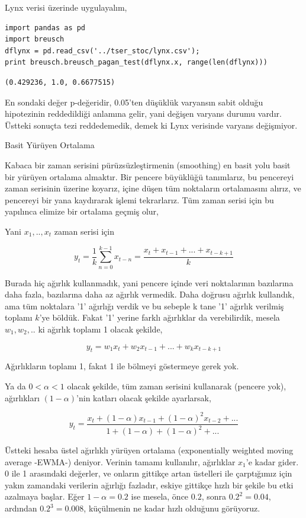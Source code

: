 \documentclass[12pt,fleqn]{article}\usepackage{../../common}
\begin{document}
\inputminted[fontsize=\footnotesize]{python}{breusch.py}

Lynx verisi üzerinde uygulayalım,

\begin{verbatim}
import pandas as pd
import breusch
dflynx = pd.read_csv('../tser_stoc/lynx.csv');
print breusch.breusch_pagan_test(dflynx.x, range(len(dflynx)))
\end{verbatim}

\begin{verbatim}
(0.429236, 1.0, 0.6677515)
\end{verbatim}

En sondaki değer p-değeridir, 0.05'ten düşüklük varyansın sabit olduğu
hipotezinin reddedildiği anlamına gelir, yani değişen varyans durumu
vardır. Üstteki sonuçta tezi reddedemedik, demek ki Lynx verisinde varyans
değişmiyor.

Basit Yürüyen Ortalama

Kabaca bir zaman serisini pürüzsüzleştirmenin (smoothing) en basit yolu
basit bir yürüyen ortalama almaktır. Bir pencere büyüklüğü tanımlarız, bu
pencereyi zaman serisinin üzerine koyarız, içine düşen tüm noktaların
ortalamasını alırız, ve pencereyi bir yana kaydırarak işlemi tekrarlarız. 
Tüm zaman serisi için bu yapılınca elimize bir ortalama geçmiş olur,

Yani $x_1,..,x_t$ zaman serisi için 

$$ 
y_t = \frac{1}{k} \sum _{n=0}^{k-1} x_{t-n}  
= \frac{x_t + x_{t-1} + ... + x_{t-k+1}}{k} 
$$

Burada hiç ağırlık kullanmadık, yani pencere içinde veri noktalarının
bazılarına daha fazla, bazılarına daha az ağırlık vermedik. Daha doğrusu
ağırlık kullandık, ama tüm noktalara '1' ağırlığı verdik ve bu sebeple k
tane '1' ağırlık verilmiş toplamı $k$'ye böldük. Fakat '1' yerine farklı
ağırlıklar da verebilirdik, mesela $w_1,w_2,..$ ki ağırlık toplamı 1 olacak
şekilde, 

$$ y_t = w_1x_t + w_2x_{t-1} + ... + w_kx_{t-k+1}
$$

Ağırlıkların toplamı 1, fakat 1 ile bölmeyi göstermeye gerek yok. 

Ya da $0 < \alpha < 1$ olacak şekilde, tüm zaman serisini kullanarak
(pencere yok), ağırlıkları $(1-\alpha)$'nin katları olacak şekilde
ayarlarsak,

$$ y_t = \frac{x_t + (1-\alpha)x_{t-1} + (1-\alpha)^2x_{t-2} + ... }
{1 + (1-\alpha) + (1-\alpha)^2 + ...} 
$$

Üstteki hesaba üstel ağırlıklı yürüyen ortalama (exponentially weighted
moving average -EWMA-) deniyor. Verinin tamamı kullanılır, ağırlıklar
$x_1$'e kadar gider. 0 ile 1 arasındaki değerler, ve onların gittikçe artan
üstelleri ile çarptığımız için yakın zamandaki verilerin ağırlığı fazladır,
eskiye gittikçe hızlı bir şekile bu etki azalmaya başlar. Eğer
$1-\alpha=0.2$ ise mesela, önce $0.2$, sonra $0.2^2=0.04$, ardından
$0.2^3=0.008$, küçülmenin ne kadar hızlı olduğunu görüyoruz.
\end{document}
